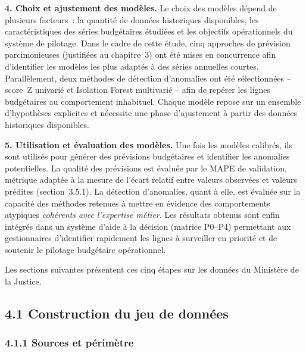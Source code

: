 \noindent\textbf{4. Choix et ajustement des mod\`eles.} Le choix des mod\`eles
d\'epend de plusieurs facteurs~: la quantit\'e de donn\'ees historiques
disponibles, les caract\'eristiques des s\'eries budg\'etaires \'etudi\'ees et
les objectifs op\'erationnels du syst\`eme de pilotage. Dans le cadre de cette
\'etude, cinq approches de pr\'evision parcimonieuses (justifi\'ees au
chapitre~3) ont \'et\'e mises en concurrence afin d'identifier les mod\`eles
les plus adapt\'es \`a des s\'eries annuelles courtes. Parall\`element, deux
m\'ethodes de d\'etection d'anomalies ont \'et\'e s\'electionn\'ees -- score~Z
univari\'e et Isolation Forest multivari\'e -- afin de rep\'erer les lignes
budg\'etaires au comportement inhabituel. Chaque mod\`ele repose sur un
ensemble d'hypoth\`eses explicites et n\'ecessite une phase d'ajustement \`a
partir des donn\'ees historiques disponibles.

\medskip

\noindent\textbf{5. Utilisation et \'evaluation des mod\`eles.} Une fois les
mod\`eles calibr\'es, ils sont utilis\'es pour g\'en\'erer des pr\'evisions
budg\'etaires et identifier les anomalies potentielles. La qualit\'e des
pr\'evisions est \'evalu\'ee par le MAPE de validation, m\'etrique adapt\'ee \`a
la mesure de l'\'ecart relatif entre valeurs observ\'ees et valeurs pr\'edites
(section~3.5.1). La d\'etection d'anomalies, quant \`a elle, est \'evalu\'ee
sur la capacit\'e des m\'ethodes retenues \`a mettre en \'evidence des
comportements atypiques \emph{coh\'erents avec l'expertise m\'etier}. Les
r\'esultats obtenus sont enfin int\'egr\'es dans un syst\`eme d'aide \`a la
d\'ecision (matrice P0--P4) permettant aux gestionnaires d'identifier
rapidement les lignes \`a surveiller en priorit\'e et de soutenir le pilotage
budg\'etaire op\'erationnel.

\medskip

Les sections suivantes pr\'esentent ces cinq \'etapes sur les donn\'ees du
Minist\`ere de la Justice.

\subsection*{4.1 \quad Construction du jeu de donn\'ees}

\subsubsection*{4.1.1 \quad Sources et p\'erim\`etre}

